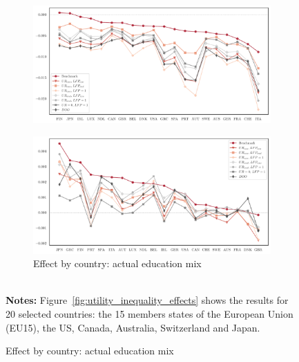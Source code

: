 \documentclass[a4paper,12pt]{article}
\begin{document}
\begin{landscape}
\begin{center}
\begin{figure}[h!]
\begin{subfigure}{.45\linewidth}
  \includegraphics[width=\linewidth]{graphs/UtilityIneq_HS.pdf}
\end{subfigure}
\hfill
\begin{subfigure}{.45\linewidth}
  \centering
    \caption{Effect by country: actual education mix} \label{fig:utility_inequality_effects_d}
  \includegraphics[width=\linewidth]{graphs/UtilityIneq_LS+HS.pdf}
\end{subfigure}
\\[0.5cm]
{\footnotesize \textbf{Notes:} Figure~\ref{fig:utility_inequality_effects} shows the results for 20 selected countries: the 15 members states of the European Union (EU15), the US, Canada, Australia, Switzerland and Japan. }
\end{figure}
\end{center}
\vspace*{\fill}
\end{landscape}
\restoregeometry
\end{document}
